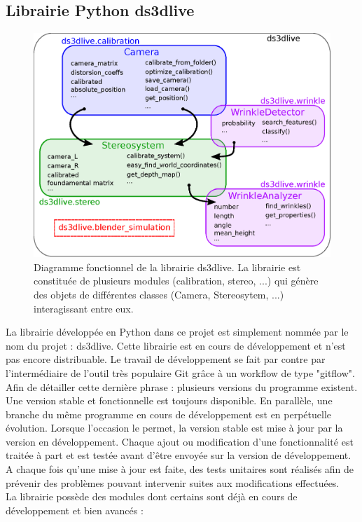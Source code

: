 \documentclass[a4paper, 11pt]{article}
\begin{document}
	\subsection{Librairie Python ds3dlive}
		\begin{figure}\centering
			\includegraphics[width=.7\linewidth]{logigramme.eps}
			\caption{\label{fig:logigramme}Diagramme fonctionnel de la librairie ds3dlive. La librairie est constituée de plusieurs modules (calibration, stereo, ...) qui génère des objets de différentes classes (Camera, Stereosytem, ...) interagissant entre eux.}
		\end{figure}
		La librairie développée en Python dans ce projet est simplement nommée par le nom du projet : ds3dlive. Cette librairie est en cours de développement et n'est pas encore distribuable. Le travail de développement se fait par contre par l'intermédiaire de l'outil très populaire Git grâce à un workflow de type "gitflow". Afin de détailler cette dernière phrase : plusieurs versions du programme existent. Une version stable et fonctionnelle est toujours disponible. En parallèle, une branche du même programme en cours de développement est en perpétuelle évolution. Lorsque l'occasion le permet, la version stable est mise à jour par la version en développement. Chaque ajout ou modification d'une fonctionnalité est traitée à part et est testée avant d'être envoyée sur la version de développement. A chaque fois qu'une mise à jour est faite, des tests unitaires sont réalisés afin de prévenir des problèmes pouvant intervenir suites aux modifications effectuées.
		\\La librairie possède des modules dont certains sont déjà en cours de développement et bien avancés :
\end{document}
